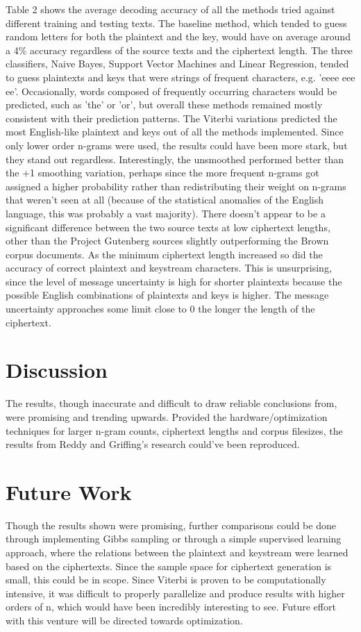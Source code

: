 \documentclass[11pt,letterpaper]{article}
\begin{document}
Table 2 shows the average decoding accuracy of all the methods tried against different training and testing texts. The baseline method, which tended to guess random letters for both the plaintext and the key, would have on average around a 4\% accuracy regardless of the source texts and the ciphertext length. The three classifiers, Naive Bayes, Support Vector Machines and Linear Regression, tended to guess plaintexts and keys that were strings of frequent characters, e.g. 'eeee eee ee'. Occasionally, words composed of frequently occurring characters would be predicted, such as 'the' or 'or', but overall these methods remained mostly consistent with their prediction patterns. 
The Viterbi variations predicted the most English-like plaintext and keys out of all the methods implemented. Since only lower order n-grams were used, the results could have been more stark, but they stand out regardless. Interestingly, the unsmoothed performed better than the +1 smoothing variation, perhaps since the more frequent n-grams got assigned a higher probability rather than redistributing their weight on n-grams that weren't seen at all (because of the statistical anomalies of the English language, this was probably a vast majority). 
There doesn't appear to be a significant difference between the two source texts at low ciphertext lengths, other than the Project Gutenberg sources slightly outperforming the Brown corpus documents. 
As the minimum ciphertext length increased so did the accuracy of correct plaintext and keystream characters. This is unsurprising, since the level of message uncertainty is high for shorter plaintexts because the possible English combinations of plaintexts and keys is higher. The message uncertainty approaches some limit close to 0 the longer the length of the ciphertext.

\section{Discussion}
The results, though inaccurate and difficult to draw reliable conclusions from, were promising and trending upwards. Provided the hardware/optimization techniques for larger n-gram counts, ciphertext lengths and corpus filesizes, the results from Reddy \cite{Reddy:12} and Griffing's \cite{Griffing:06} research could've been reproduced.

\section{Future Work}
Though the results shown were promising, further comparisons could be done through implementing Gibbs sampling or through a simple supervised learning approach, where the relations between the plaintext and keystream were learned based on the ciphertexts. Since the sample space for ciphertext generation is small, this could be in scope. Since Viterbi is proven to be computationally intensive, it was difficult to properly parallelize and produce results with higher orders of n, which would have been incredibly interesting to see. Future effort with this venture will be directed towards optimization.
\end{document}
